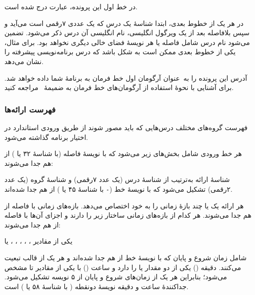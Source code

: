 \documentclass{utap}
\renewcommand{\labelitemi}{$\circ$}
\renewcommand{\labelitemii}{$\diamond$}
\begin{document}
    در خط اول این پرونده، عبارت  درج شده است.

    در هر یک از خطوط بعدی، ابتدا شناسهٔ یک درس که یک عددی ۷‌رقمی است می‌آید و سپس بلافاصله بعد از یک ویرگول انگلیسی، نام انگلیسی آن درس ذکر می‌شود. تضمین می‌شود نام درس شامل فاصله یا هر نویسهٔ فضای خالی دیگری نخواهد بود. برای مثال، یکی از خطوط بعدی ممکن است به شکل  باشد که درس برنامه‌نویسی پیشرفته را نشان می‌دهد.

    آدرس این پرونده را به~عنوان آرگومان اول خط فرمان به برنامهٔ شما داده خواهد شد. برای آشنایی با نحوهٔ استفاده از آرگومان‌های خط فرمان به ضمیمهٔ~ مراجعه کنید.

    \subsubsection{فهرست ارائه‌ها}

    فهرست گروه‌های مختلف درس‌هایی که باید مصور شوند از طریق ورودی استاندارد  در اختیار برنامه گذاشته می‌شود.

    هر خط ورودی شامل بخش‌های زیر می‌شود که با نویسهٔ فاصله (با شناسهٔ  ۳۲ یا ) از هم جدا می‌شوند:
    \begin{description}[leftmargin=9em,style=nextline,font=\labelitemi\quad\bfseries]
        \item[شناسهٔ ارائه] شناسهٔ ارائه به‌ترتیب از شناسهٔ درس (یک عدد ۷‌رقمی) و شناسهٔ گروه (یک عدد ۲‌رقمی) تشکیل می‌شود که با نویسهٔ خط (\verb|-| با شناسهٔ  ۴۵ یا ) از هم جدا شده‌اند.
        \item[بازه‌های زمانی ارائه] هر ارائه یک یا چند بازهٔ زمانی را به خود اختصاص می‌دهد. بازه‌های زمانی با فاصله از هم جدا می‌شوند. هر کدام از بازه‌های زمانی ساختار زیر را دارند و اجزای آن‌ها با فاصله از هم جدا می‌شوند:
        \begin{description}[leftmargin=4em,style=nextline,font=\labelitemii\quad\bfseries]
            \item[روز] یکی از مقادیر ، ، ، ، ،  یا 
            \item[زمان] شامل زمان شروع و پایان که با نویسهٔ خط از هم جدا شده‌اند و هر یک از قالب  تبعیت می‌کنند. دقیقه () یکی از دو مقدار  یا  را دارد و ساعت () با یکی از مقادیر  تا  مشخص می‌شود؛ بنابراین هر یک از زمان‌های شروع و پایان از ۵ نویسه تشکیل می‌شود. جداکنندهٔ ساعت و دقیقه نویسهٔ دونقطه (\lr{\texttt{:}} با شناسهٔ  ۵۸ یا ) است.
        \end{description}
    \end{description}
\end{document}
